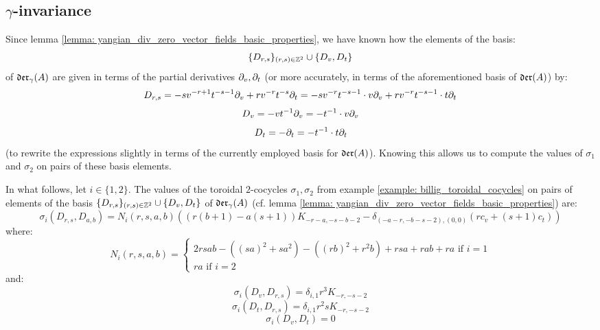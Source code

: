     \subsection{\texorpdfstring{$\gamma$}{}-invariance}
        Since lemma \ref{lemma: yangian_div_zero_vector_fields_basic_properties}, we have known how the elements of the  basis:
            $$\{D_{r, s}\}_{(r, s) \in \mathbb{Z}^2} \cup \{D_v, D_t\}$$
        of $\mathfrak{der}_{\gamma}(A)$ are given in terms of the partial derivatives $\partial_v, \partial_t$ (or more accurately, in terms of the aforementioned basis of $\mathfrak{der}(A)$) by:
            $$D_{r, s} = -s v^{-r + 1} t^{-s - 1} \partial_v + r v^{-r} t^{-s} \partial_t = -s v^{-r} t^{-s - 1} \cdot v\partial_v + r v^{-r} t^{-s - 1} \cdot t\partial_t$$
            $$D_v = -v t^{-1} \partial_v = -t^{-1} \cdot v\partial_v$$
            $$D_t = -\partial_t = -t^{-1} \cdot t\partial_t$$
        (to rewrite the expressions slightly in terms of the currently employed basis for $\mathfrak{der}(A)$). Knowing this allows us to compute the values of $\sigma_1$ and $\sigma_2$ on pairs of these basis elements.
        \begin{lemma} \label{lemma: billig_toroidal_cocycles_on_yangian_div_zero_vector_fields}
            In what follows, let $i \in \{1, 2\}$. The values of the toroidal $2$-cocycles $\sigma_1, \sigma_2$ from example \ref{example: billig_toroidal_cocycles} on pairs of elements of the basis $\{D_{r, s}\}_{(r, s) \in \mathbb{Z}^2} \cup \{D_v, D_t\}$ of $\mathfrak{der}_{\gamma}(A)$ (cf. lemma \ref{lemma: yangian_div_zero_vector_fields_basic_properties}) are:
                $$\sigma_i(D_{r, s}, D_{a, b}) = N_i(r, s, a, b) \left( ( r(b + 1) - a(s + 1) )K_{-r - a, -s - b - 2} - \delta_{ (-a - r, -b - s - 2), (0, 0) } (r c_v + (s + 1) c_t) \right)$$
            where:
                \begin{equation} \label{equation: billig_cocycles_coefficient}
                    N_i(r, s, a, b) =
                    \begin{cases}
                        \text{$2 rsab - ( (sa)^2 + s a^2 ) - ( (rb)^2 + r^2 b ) + rsa + rab + ra$ if $i = 1$}
                        \\
                        \text{$ra$ if $i = 2$}
                    \end{cases}
                \end{equation}
            and:
                $$\sigma_i(D_v, D_{r, s}) = \delta_{i, 1} r^3 K_{-r, -s - 2}$$
                $$\sigma_i(D_t, D_{r, s}) = \delta_{i, 1} r^2 s K_{-r, -s - 2}$$
                $$\sigma_i(D_v, D_t) = 0$$
        \end{lemma}
